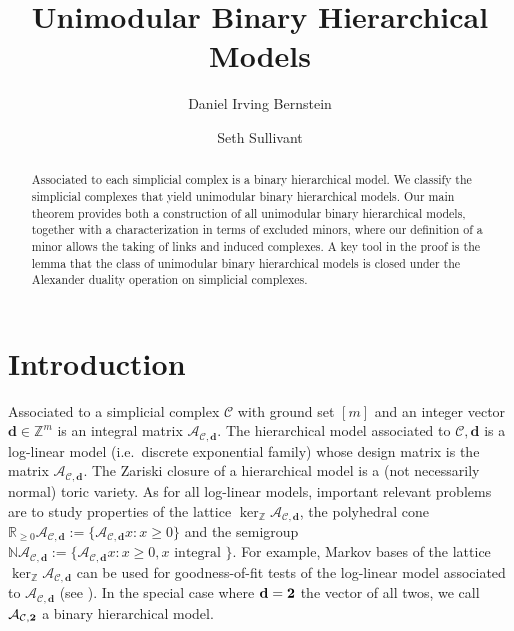 \documentclass[letterpaper,12pt]{amsart}
\title{Unimodular Binary Hierarchical Models}
\author{Daniel Irving Bernstein}
\author{Seth Sullivant}
\theoremstyle{plain}
\theoremstyle{definition}
\theoremstyle{remark}
\newcommand{\zz}{\mathbb{Z}}
\newcommand{\nn}{\mathbb{N}}
\newcommand{\rr}{\mathbb{R}}
\newcommand{\bfd}{\mathbf{d}}
\newcommand{\calc}{\mathcal{C}}
\begin{document}
\begin{abstract}
Associated to each simplicial complex is a binary hierarchical model.
We classify the simplicial complexes that yield unimodular
binary hierarchical models.  Our main theorem provides
both a construction of all unimodular binary hierarchical models, together
with a characterization in terms of excluded minors,
{where our definition of a minor allows the taking of links and induced complexes.}
A key tool in the
proof is the lemma that the class of unimodular binary hierarchical models is closed
under the Alexander duality operation on simplicial complexes.
\end{abstract}

\maketitle



\section{Introduction}\label{introduction}




Associated to a simplicial complex $\calc$ with ground set $[m]$
and an integer vector $\bfd \in \zz^m$ is an integral matrix
$\mathcal{A}_{\calc, \bfd}$.  The hierarchical model associated to
$\calc, \bfd$ is a log-linear model (i.e.~discrete exponential family) whose design matrix is the matrix $\mathcal{A}_{\calc, \bfd}$.
{ The Zariski closure of a hierarchical model is a (not necessarily normal) toric variety.}
As for all log-linear models, important relevant problems
are to study properties of the lattice $\ker_\zz \mathcal{A}_{\calc, \bfd}$,
the polyhedral cone 
$\rr_{\geq 0} \mathcal{A}_{\calc, \bfd} := \{\mathcal{A}_{\calc, \bfd}x : x \geq 0 \} $ 
and the semigroup
$\nn \mathcal{A}_{\calc, \bfd} :=  \{\mathcal{A}_{\calc, \bfd}x : x \geq 0, x \mbox{ integral } \} $.  For example, Markov bases of the lattice $\ker_\zz \mathcal{A}_{\calc, \bfd}$
can be used for goodness-of-fit tests of the log-linear model
associated to $\mathcal{A}_{\calc, \bfd}$ (see \cite{Diaconis1998}).
In the special case where $\bfd = {\bf 2}$ the vector of all twos,
 we call $\mathcal{A}_{\calc, {\bf 2}}$ a
binary hierarchical model.  
\end{document}
